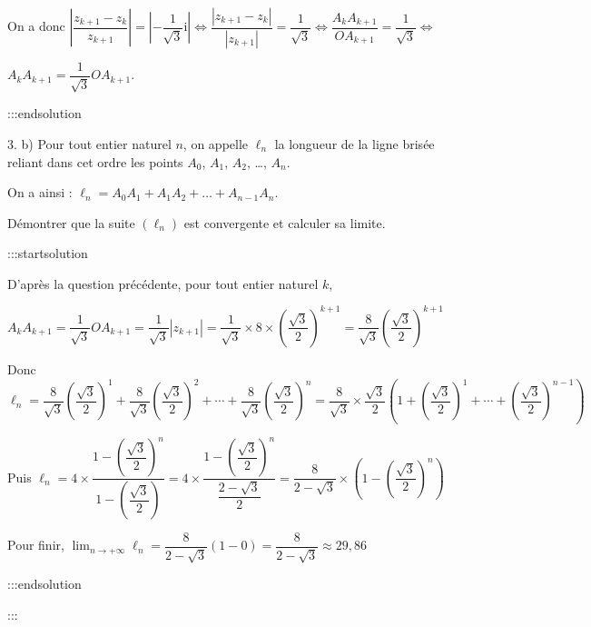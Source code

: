 \documentclass{cornouaille}
\begin{document}
On a donc $\left|\dfrac{z_{k+1} - z_k}{z_{k+1} }\right| = \left|- \dfrac{1}{\sqrt{3}} \text{i}\right|
\iff \dfrac{\left|z_{k+1} - z_k \right|}{\left|z_{k+1} \right|} = \dfrac{1}{\sqrt{3}}
\iff \dfrac{A_kA_{k+1}}{OA_{k+1}} = \dfrac{1}{\sqrt{3}}
\iff $

$A_kA_{k+1} = \dfrac{1}{\sqrt{3}} OA_{k+1}$.


:::endsolution


3. b)  Pour tout entier naturel $n$, on appelle $\ell_n$ la longueur de la ligne brisée reliant dans cet ordre les points $A_0$,\: $A_1$,\: $A_2$, \ldots , $A_n$.

On a ainsi : $\ell_n = A_0A_1 + A_1A_2 + \ldots + A_{n-1}A_n$.

Démontrer que la suite $\left(\ell_n\right)$ est convergente et calculer sa limite.


:::startsolution

D'après la question précédente, pour tout entier naturel $k$,\smallskip

$A_kA_{k+1} = \dfrac{1}{\sqrt{3}} OA_{k+1} = \dfrac{1}{\sqrt{3}} \left|z_{k+1} \right| = \dfrac{1}{\sqrt{3}} \times 8 \times \left( \dfrac{\sqrt{3}}{2} \right)^{k+1} = \dfrac{8}{\sqrt{3}} \left( \dfrac{\sqrt{3}}{2} \right)^{k+1}$ \medskip

Donc $\ell_n=\dfrac{8}{\sqrt{3}} \left( \dfrac{\sqrt{3}}{2} \right)^1 + \dfrac{8}{\sqrt{3}} \left( \dfrac{\sqrt{3}}{2} \right)^2 + \cdots + \dfrac{8}{\sqrt{3}} \left( \dfrac{\sqrt{3}}{2} \right)^n
= \dfrac{8}{\sqrt{3}} \times \dfrac{\sqrt{3}}{2} \left( 1 +  \left( \dfrac{\sqrt{3}}{2} \right)^1 + \cdots + \left( \dfrac{\sqrt{3}}{2} \right)^{n-1} \right)$\medskip

Puis $\ell_n=4 \times \dfrac{1 - \left( \dfrac{\sqrt{3}}{2} \right)^{n} }{1-\left( \dfrac{\sqrt{3}}{2} \right)}
=4 \times \dfrac{1 - \left( \dfrac{\sqrt{3}}{2} \right)^{n} }{\dfrac{2-\sqrt{3}}{2}}
=\dfrac{8}{2-\sqrt{3}} \times \left( 1 - \left( \dfrac{\sqrt{3}}{2} \right)^{n} \right)$\medskip

Pour finir, $\displaystyle\lim_{n \to + \infty} \ell_n=\dfrac{8}{2-\sqrt{3}}(1-0) =\dfrac{8}{2-\sqrt{3}} \approx 29,86$


:::endsolution






:::
\end{document}
